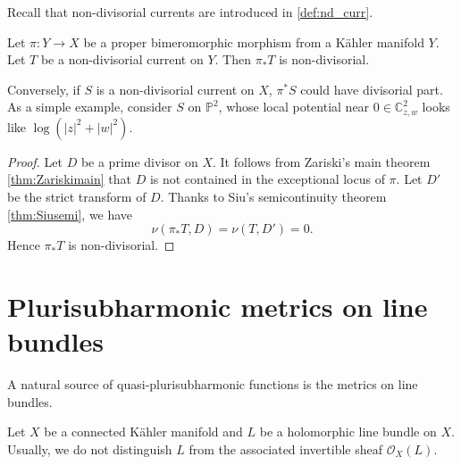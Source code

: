 Recall that non-divisorial currents are introduced in \cref{def:nd_curr}.
\begin{lemma}\label{lma:ndvpush}
    Let $\pi\colon Y\rightarrow X$ be a proper bimeromorphic morphism from a Kähler manifold $Y$. Let $T$ be a non-divisorial current on $Y$. Then $\pi_*T$ is non-divisorial.
\end{lemma}
Conversely, if $S$ is a non-divisorial current on $X$, $\pi^*S$ could have divisorial part. As a simple example, consider $S$ on $\mathbb{P}^2$, whose local potential near $0\in \mathbb{C}^2_{z,w}$ looks like $\log (|z|^2+|w|^2)$.

\begin{proof}
    Let $D$ be a prime divisor on $X$. It follows from Zariski's main theorem \cref{thm:Zariskimain} that $D$ is not contained in the exceptional locus of $\pi$.
    Let $D'$ be the strict transform of $D$. Thanks to Siu's semicontinuity theorem \cref{thm:Siusemi}, we have
    \[
    \nu(\pi_*T,D)=\nu(T,D')=0.
    \]
    Hence $\pi_*T$ is non-divisorial.
\end{proof}



\section{Plurisubharmonic metrics on line bundles}\label{sec:pshmetriconlb}
A natural source of quasi-plurisubharmonic functions is the metrics on line bundles.

Let $X$ be a connected Kähler manifold and $L$ be a holomorphic line bundle on $X$. Usually, we do not distinguish $L$ from the associated invertible sheaf $\mathcal{O}_X(L)$.

